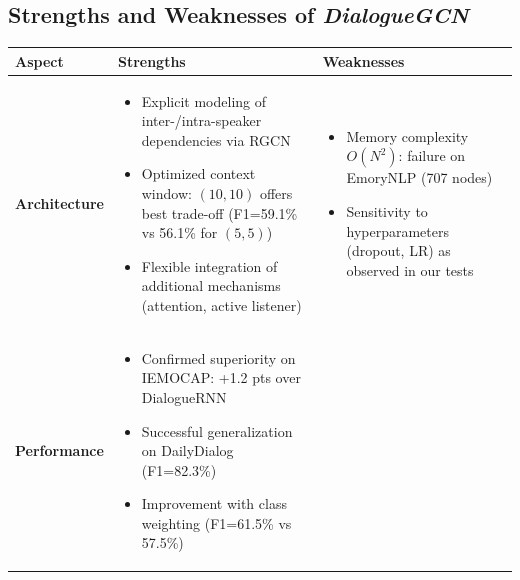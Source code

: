 \documentclass[a4paper,11pt]{article}
\begin{document}
\subsection{Strengths and Weaknesses of \emph{DialogueGCN}}

\begin{table}[ht]
  \centering
  \begin{tabular}{l p{6cm} p{6cm}}
    \toprule
    \textbf{Aspect} & \textbf{Strengths} & \textbf{Weaknesses} \\
    \midrule
    \textbf{Architecture} &
      \begin{minipage}[t]{6cm}
        \begin{itemize}
          \item Explicit modeling of inter-/intra-speaker dependencies via RGCN \cite{ghosal2019dialoguegcn}
          \item Optimized context window: $(10,10)$ offers best trade-off (F1=59.1\% vs 56.1\% for $(5,5)$)
          \item Flexible integration of additional mechanisms (attention, active listener)
        \end{itemize}
      \end{minipage}
    &
      \begin{minipage}[t]{6cm}
        \begin{itemize}
          \item Memory complexity $O(N^2)$: failure on EmoryNLP (707 nodes) \cite{zhangetal2019memory}
          \item Sensitivity to hyperparameters (dropout, LR) as observed in our tests
        \end{itemize}
      \end{minipage}
    \\
    \midrule
    \textbf{Performance} &
      \begin{minipage}[t]{6cm}
        \begin{itemize}
          \item Confirmed superiority on IEMOCAP: +1.2 pts over DialogueRNN \cite{ghosal-etal-2019-dialoguegcn}
          \item Successful generalization on DailyDialog (F1=82.3\%)
          \item Improvement with class weighting (F1=61.5\% vs 57.5\%)
        \end{itemize}
      \end{minipage}
    &
      \begin{minipage}[t]{6cm}
        \begin{itemize}

\end{itemize}
\end{minipage}
\end{tabular}
\end{table}
\end{document}
